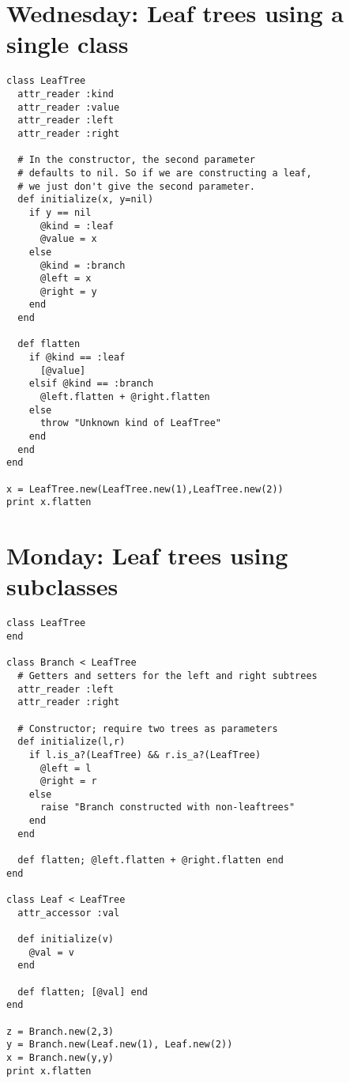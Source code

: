 \documentclass[11pt]{article}
\begin{document}
\section{Wednesday: Leaf trees using a single class}
\label{sec:org329d482}
\begin{verbatim}
class LeafTree
  attr_reader :kind
  attr_reader :value
  attr_reader :left
  attr_reader :right

  # In the constructor, the second parameter
  # defaults to nil. So if we are constructing a leaf,
  # we just don't give the second parameter.
  def initialize(x, y=nil)
    if y == nil
      @kind = :leaf
      @value = x
    else
      @kind = :branch
      @left = x
      @right = y
    end
  end

  def flatten
    if @kind == :leaf
      [@value]
    elsif @kind == :branch
      @left.flatten + @right.flatten
    else
      throw "Unknown kind of LeafTree"
    end
  end
end

x = LeafTree.new(LeafTree.new(1),LeafTree.new(2))
print x.flatten
\end{verbatim}

\section{Monday: Leaf trees using subclasses}
\label{sec:org0ed1b51}
\begin{verbatim}
class LeafTree
end

class Branch < LeafTree
  # Getters and setters for the left and right subtrees
  attr_reader :left
  attr_reader :right

  # Constructor; require two trees as parameters
  def initialize(l,r)
    if l.is_a?(LeafTree) && r.is_a?(LeafTree)
      @left = l
      @right = r
    else
      raise "Branch constructed with non-leaftrees"
    end
  end

  def flatten; @left.flatten + @right.flatten end
end

class Leaf < LeafTree
  attr_accessor :val

  def initialize(v)
    @val = v
  end

  def flatten; [@val] end
end

z = Branch.new(2,3)
y = Branch.new(Leaf.new(1), Leaf.new(2))
x = Branch.new(y,y)
print x.flatten
\end{verbatim}
\end{document}
